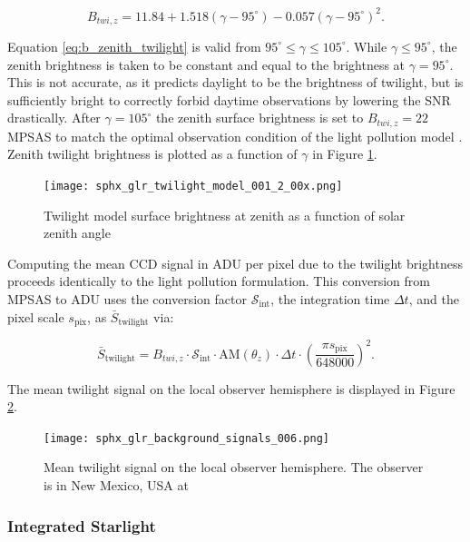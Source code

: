 \begin{equation} \label{eq:b_zenith_twilight}
  B_{twi,z} = 11.84 + 1.518(\gamma - 95^\circ) - 0.057 (\gamma -  95^\circ)^2.
\end{equation}

Equation \ref{eq:b_zenith_twilight} is valid from $95^\circ \leq \gamma \leq 105^\circ$. While $\gamma \le 95^\circ$, the zenith brightness is taken to be constant and equal to the brightness at $\gamma = 95^\circ$. This is not accurate, as it predicts daylight to be the brightness of twilight, but is sufficiently bright to correctly forbid daytime observations by lowering the SNR drastically. After $\gamma = 105^\circ$ the zenith surface brightness is set to $B_{twi,z} = 22$ MPSAS to match the optimal observation condition of the light pollution model \cite{krag2003}. Zenith twilight brightness is plotted as a function of $\gamma$ in Figure \ref{fig:twilight_model}.

\begin{figure}[ht]
  \centering
  \texttt{[image: sphx\_glr\_twilight\_model\_001\_2\_00x.png]}
  \caption{Twilight model surface brightness at zenith as a function of solar zenith angle}
  \label{fig:twilight_model}
\end{figure}

Computing the mean CCD signal in ADU per pixel due to the twilight brightness proceeds identically to the light pollution formulation. This conversion from MPSAS to ADU uses the conversion factor $\mathcal{S}_\mathrm{int}$, the integration time $\Delta t$, and the pixel scale $s_\mathrm{pix}$, as $\bar{S}_\mathrm{twilight}$ via:

\begin{equation} \label{eq:twilight_adu}
  \bar{S}_\mathrm{twilight} = B_{twi,z} \cdot \mathcal{S}_\mathrm{int} \cdot \textrm{AM}(\theta_z) \cdot \Delta t \cdot \left( \frac{\pi s_\mathrm{pix}}{648000} \right)^2.
\end{equation}

The mean twilight signal on the local observer hemisphere is displayed in Figure \ref{fig:twilight_hemi}.

\begin{figure}[ht]
  \centering
  \texttt{[image: sphx\_glr\_background\_signals\_006.png]}
  \caption{Mean twilight signal on the local observer hemisphere. The observer is in New Mexico, USA at
  \pogslla}
  \label{fig:twilight_hemi}
\end{figure}

\subsubsection{Integrated Starlight}

